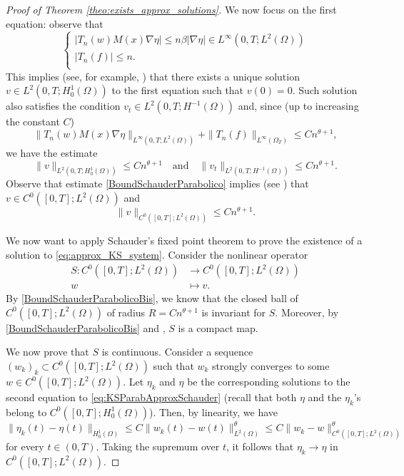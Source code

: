 \documentclass{amsart}
\numberwithin{equation}{section}
\def\elle#1{L^{#1}}
\def\elleom#1{L^{#1}(\Omega)}
\def\Hom{H^1_0(\Omega)}
\def\norma#1#2{ \|#1 \|_{#2}}
\newcommand{\abs}[1]{\left|#1\right|}
\begin{document}
\begin{proof}[Proof of Theorem \ref{theo:exists_approx_solutions}]
    We now focus on the first equation: observe that
    \begin{equation}
        \left\{\begin{array}{cc}
           \abs{T_n(w) M(x) \nabla \eta}\leq n\beta\abs{\nabla \eta}\in\elle\infty(0,T;\elleom2)\\
           |T_n(f)|\leq n.\\
        \end{array}\right.
    \end{equation}
    This implies (see, for example, \cite{Lions}) that there exists a unique solution $v\in\elle2(0,T;\Hom)$ to the first equation such that $v(0)=0$. Such solution also satisfies the condition $v_t\in\elle2(0,T;H^{-1}(\Omega))$ and, since (up to increasing the constant $C$)
    $$\norma{T_n(w) M(x) \nabla \eta}{\elle\infty(0,T;\elleom2)}+\norma{T_n(f)}{\elle\infty(\Omega_T)}\leq Cn^{\theta+1},$$
    we have the estimate
    \begin{equation}\label{BoundSchauderParabolico}
        \norma{v}{\elle2(0,T;\Hom)}\leq Cn^{\theta+1}\quad \text{and}\quad \norma{v_t}{\elle2(0,T;H^{-1}(\Omega))}\leq Cn^{\theta+1}.
    \end{equation}
    Observe that estimate \eqref{BoundSchauderParabolico} implies (see \cite[Section 5.9.2]{EvansPDE}) that $v\in C^0([0,T];\elleom2)$ and 
    \begin{equation}\label{BoundSchauderParabolicoBis}
        \norma{v}{C^0([0,T];\elleom2)}\leq Cn^{\theta+1}.
    \end{equation}

    We now want to apply Schauder's fixed point theorem to prove the existence of a solution to \eqref{eq:approx_KS_system}. Consider the nonlinear operator
    \begin{align*}
         S: C^0([0,T];\elleom2) & \to C^0([0,T];\elleom2)\\
        w&\longmapsto v.
    \end{align*}
    By \eqref{BoundSchauderParabolicoBis}, we know that the closed ball of $C^0([0,T];\elleom2)$ of radius $R=C n^{\theta+1}$ is invariant for $S$. Moreover, by \eqref{BoundSchauderParabolicoBis} and \cite[Corollary 4]{Simon}, $S$ is a compact map.
    
    We now prove that $S$ is continuous. Consider a sequence $(w_k)_k\subset C^0([0,T];\elleom2)$ such that $w_k$ strongly converges to some $w\in C^0([0,T];\elleom2)$. Let $\eta_k$ and $\eta$ be the corresponding solutions to the second equation to \eqref{eq:KSParabApproxSchauder} (recall that both $\eta$ and the $\eta_k$'s belong to $C^0([0,T];\Hom)$). Then, by linearity, we have
    $$\norma{\eta_k(t)-\eta(t)}{\Hom}\leq C\norma{w_k(t)-w(t)}{\elleom2}^\theta\leq C\norma{w_k-w}{C^0([0,T];\elleom2)}^\theta$$
    for every $t\in(0,T)$. Taking the supremum over $t$, it follows that $\eta_k\to\eta$ in $C^0([0,T];\elleom2)$.
    

\end{proof}
\end{document}
